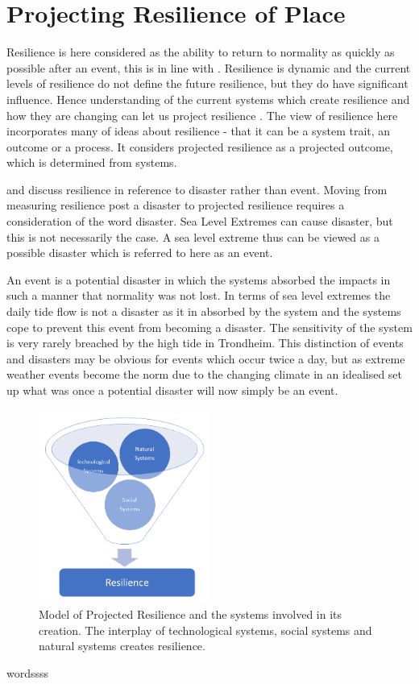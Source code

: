 \section{Projecting Resilience of Place} 
Resilience is here considered as the ability to return to normality as quickly as possible after an event, this is in line with \cite{cutter_place-based_2008}. Resilience is dynamic and the current levels of resilience do not define the future resilience, but they do have significant influence. Hence understanding of the current systems which create resilience and how they are changing can let us project resilience \cite{cutter_community_2020}. The view of resilience here incorporates many of \cite{moser_turbulent_2019} ideas about resilience -  that it can be a system trait, an outcome or a process. It considers projected resilience as a projected outcome, which is determined from systems. 

\cite{cutter_place-based_2008} and \cite{cutter_community_2020} discuss resilience in reference to disaster rather than event. Moving from measuring resilience post a disaster to projected resilience requires a consideration of the word disaster. Sea Level Extremes can cause disaster, but this is not necessarily the case. A sea level extreme thus can be viewed as a possible disaster which is referred to here as an event. 

An event is a potential disaster in which the systems absorbed the impacts in such a manner that normality was not lost. In terms of sea level extremes the daily tide flow is not a disaster as it in absorbed by the system and the systems cope to prevent this event from becoming a disaster. The sensitivity of the system is very rarely breached by the high tide in Trondheim. This distinction of events and disasters may be obvious for events which occur twice a day, but as extreme weather events become the norm due to the changing climate in an idealised set up what was once a potential disaster will now simply be an event. 

\begin{figure}[h]
    \centering
    \includegraphics[width=0.5\textwidth]{fig_theory/resilience model .png}
    \caption{Model of Projected Resilience and the systems involved in its creation. The interplay of technological systems, social systems and natural systems creates resilience. }
    \label{fig:projected_resilience}
\end{figure}
wordssss

